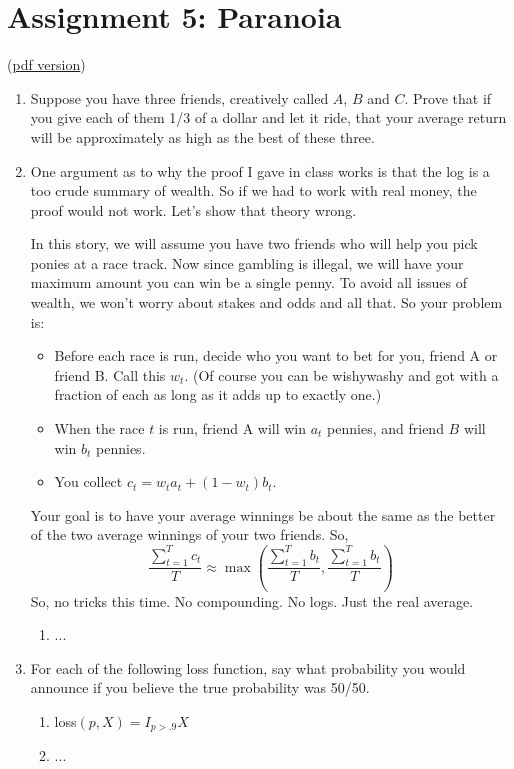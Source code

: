 \documentclass[11pt]{article}
\begin{document}
\section*{Assignment 5: Paranoia}

(\href{assignment5.pdf}{pdf version}) 

\begin{enumerate}
\item Suppose you have three friends, creatively called $A$, $B$ and
$C$.  Prove that if you give each of them 1/3 of a dollar and let it
ride, that your average return will be approximately as high as the
best of these three.

\item One argument as to why the proof I gave in class works is that
the log is a too crude summary of wealth.  So if we had to work with
real money, the proof would not work.  Let's show that theory wrong.

In this story, we will assume you have two friends who will help you
pick ponies at a race track.  Now since gambling is illegal, we will
have your maximum amount you can win be a single penny.  To avoid all
issues of wealth, we won't worry about stakes and odds and all that.
So your problem is:

\begin{itemize}
\item Before each race is run, decide who you want to bet for you,
 friend A or friend B.  Call this $w_t$.  (Of course you can be
 wishywashy and got with a fraction of each as long as it adds up to
 exactly one.)
\item When the race $t$ is run, friend A will win $a_t$ pennies, and
friend $B$ will win $b_t$ pennies.
\item You collect $c_t = w_t a_t + (1-w_t) b_t$.
\end{itemize}

Your goal is to have your average winnings be about the same as the
better of the two average winnings of your two friends.  So,
\begin{displaymath}
\frac{\sum_{t=1}^T c_t}{T} \approx \max(\frac{\sum_{t=1}^T b_t}{T},\frac{\sum_{t=1}^T b_t}{T})
\end{displaymath}
So, no tricks this time.  No compounding.  No logs.  Just the real
average. 
\begin{enumerate}
\item ...
\end{enumerate}

\item For each of the following loss function, say what probability
you would announce if you believe the true probability was 50/50.
\begin{enumerate}
\item loss$(p,X) = I_{p>.9}X$
\item ...
\end{enumerate}


\end{enumerate}
\end{document}
